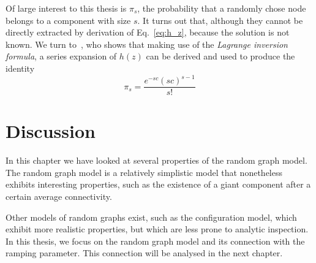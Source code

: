 Of large interest to this thesis is $\pi_s$, the probability that a randomly chose node belongs to a component with size $s$.
It turns out that, although they cannot be directly extracted by derivation of Eq.~\ref{eq:h_z}, because the solution is not known.
We turn to~\cite{newman2010networks}, who shows that making use of the \textit{Lagrange inversion formula}, a series expansion of $h(z)$ can be derived and used to produce the identity
\begin{equation}
	\pi_s = \frac{e^{-sc}(sc)^{s-1}}{s!} 
\end{equation}

\section{Discussion} %
\label{sec:discussion}

In this chapter we have looked at several properties of the random graph model.
The random graph model is a relatively simplistic model that nonetheless exhibits interesting properties, such as the existence of a giant component after a certain average connectivity.

Other models of random graphs exist, such as the configuration model, which exhibit more realistic properties, but which are less prone to analytic inspection.
In this thesis, we focus on the random graph model and its connection with the ramping parameter.
This connection will be analysed in the next chapter.





















